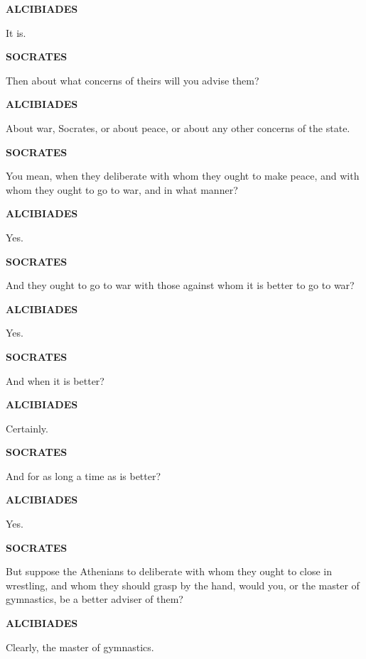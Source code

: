 \documentclass[11pt,letter]{article}
\begin{document}
\par \textbf{ALCIBIADES}
\par   It is.

\par \textbf{SOCRATES}
\par   Then about what concerns of theirs will you advise them?

\par \textbf{ALCIBIADES}
\par   About war, Socrates, or about peace, or about any other concerns of the state.

\par \textbf{SOCRATES}
\par   You mean, when they deliberate with whom they ought to make peace, and with whom they ought to go to war, and in what manner?

\par \textbf{ALCIBIADES}
\par   Yes.

\par \textbf{SOCRATES}
\par   And they ought to go to war with those against whom it is better to go to war?

\par \textbf{ALCIBIADES}
\par   Yes.

\par \textbf{SOCRATES}
\par   And when it is better?

\par \textbf{ALCIBIADES}
\par   Certainly.

\par \textbf{SOCRATES}
\par   And for as long a time as is better?

\par \textbf{ALCIBIADES}
\par   Yes.

\par \textbf{SOCRATES}
\par   But suppose the Athenians to deliberate with whom they ought to close in wrestling, and whom they should grasp by the hand, would you, or the master of gymnastics, be a better adviser of them?

\par \textbf{ALCIBIADES}
\par   Clearly, the master of gymnastics.
\end{document}
